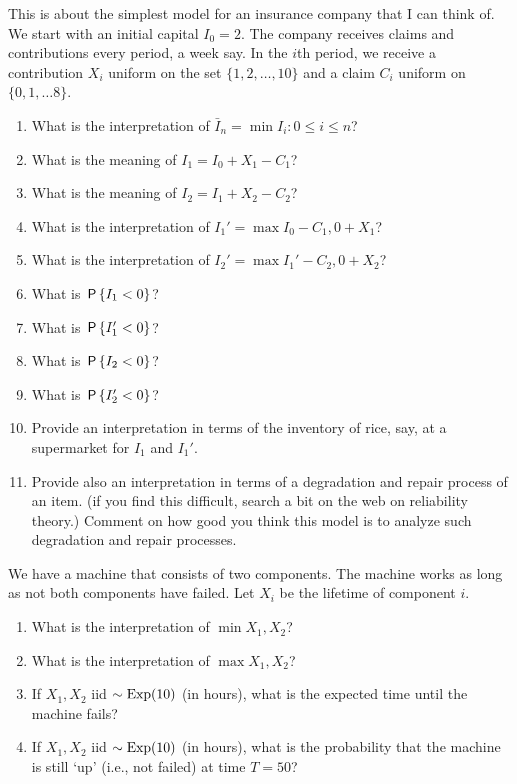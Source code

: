 \documentclass[assignments]{subfiles}
\begin{document}
\begin{exercise}
This is about the simplest model for an insurance company that I can think of.
We start with an initial capital $I_0=2$.
The company receives claims and contributions every period, a week say.
In the $i$th period, we receive a contribution $X_{i}$ uniform on the set $\{1, 2,\ldots,10\}$ and a claim $C_i$ uniform on $\{0, 1, \ldots 8\}$.
\begin{enumerate}
\item What is the interpretation of $\bar I_{n} = \min{I_{i} : 0\leq i\leq n}$? 
\item What is the meaning of $I_1=I_0+X_1-C_1$?
\item What is the meaning of $I_2=I_1+X_2-C_2$?
\item What is the interpretation of $I_1'=\max{I_0-C_1,0} + X_1$?
\item What is the interpretation of $I_2'=\max{I_1'-C_2,0} + X_2$?
\item What is  $\P{I_1 < 0}$?
\item What is  $\P{I_1' < 0}$?
\item What is  $\P{I_2 < 0}$?
\item What is  $\P{I_2' < 0}$?
\item Provide an interpretation in terms of the inventory of rice, say, at a supermarket for $I_{1}$ and $I_{1}'$.
\item Provide also an interpretation in terms of a degradation and repair process of an item.
  (if you find this difficult, search a bit on the web on reliability theory.)
  Comment on how good you think this model is to analyze such degradation and repair processes.
\end{enumerate}
\end{exercise}

\begin{exercise}
We have a machine that consists of two components. The machine works as long as not both components have failed. Let $X_i$ be the lifetime of component $i$. 
\begin{enumerate}
\item What is the interpretation of $\min{X_1, X_{2}}$?
\item What is the interpretation of $\max{X_1, X_{2}}$?
\item If $X_1, X_2$ iid $\sim \Exp{10}$ (in hours), what is the expected time until the machine fails? 
\item If $X_1, X_2$ iid $\sim \Exp{10}$ (in hours), what is the probability that the machine is still `up' (i.e., not failed) at time $T=50$? 
\end{enumerate}
\end{exercise}
\end{document}
